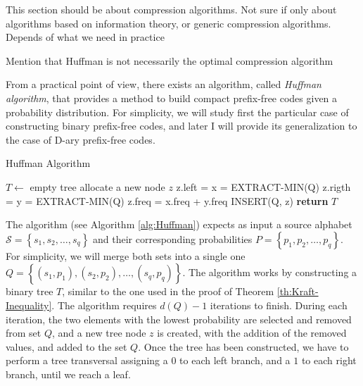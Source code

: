 {\color{red} This section should be about compression algorithms. Not sure if only about algorithms based on information theory, or generic compression algorithms. Depends of what we need in practice}

{\color{red} Mention that Huffman is not necessarily the optimal compression algorithm}

From a practical point of view, there exists an algorithm, called \emph{Huffman algorithm}, that provides a method to build compact prefix-free codes given a probability distribution. For simplicity, we will study first the particular case of constructing binary prefix-free codes, and later I will provide its generalization to the case of D-ary prefix-free codes.

\begin{algorithm}
\caption{Huffman Algorithm}
\label{alg:Huffman}
\begin{algorithmic}
    \State $T \gets$ empty tree
        \State allocate a new node $z$
        \State z.left = x = EXTRACT-MIN(Q)
        \State z.rigth = y = EXTRACT-MIN(Q)
        \State z.freq = x.freq + y.freq
        \State INSERT(Q, z)
    \EndFor
    \State \textbf{return} $T$
\EndProcedure
\end{algorithmic}
\end{algorithm}

The algorithm (see Algorithm \ref{alg:Huffman}) expects as input a source alphabet $\mathcal{S}=\left\{ s_{1},s_{2},\ldots,s_{q}\right\}$ and their corresponding probabilities $P = \left\{ p_{1}, p_{2}, \ldots, p_{q} \right\}$. For simplicity, we will merge both sets into a single one $Q = \left\{ (s_{1}, p_{1}), (s_{2}, p_{2}), \ldots, (s_{q}, p_{q}) \right\}$. The algorithm works by constructing a binary tree $T$, similar to the one used in the proof of Theorem \ref{th:Kraft-Inequality}. The algorithm requires $d(Q) - 1$ iterations to finish. During each iteration, the two elements with the lowest probability are selected and removed from set $Q$, and a new tree node $z$ is created, with the addition of the removed values, and added to the set $Q$. Once the tree has been constructed, we have to perform a tree transversal assigning a $0$ to each left branch, and a $1$ to each right branch, until we reach a leaf.

